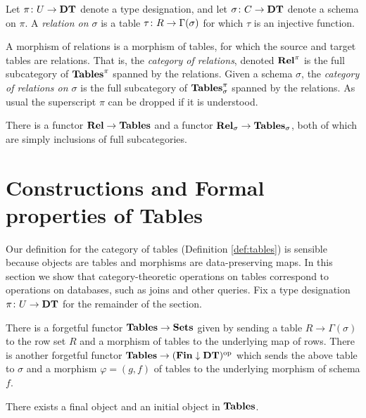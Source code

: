 \documentclass{amsart}
\def\DT{{\bf DT}}
\def\Tables{{\bf Tables}}
\def\Rel{{\bf Rel}}
\def\Fin{{\bf Fin}}
\begin{document}
\begin{definition}\label{def:relational table}

Let $\pi\taking U\to\DT$ denote a type designation, and let $\sigma\taking C\to\DT$ denote a schema on $\pi$.  A {\em relation on $\sigma$} is a table $\tau\colon R\rightarrow\Gamma(\sigma)$ for which $\tau$ is an injective function.  

A morphism of relations is a morphism of tables, for which the source and target tables are relations.  That is, the {\em category of relations}, denoted $\Rel^\pi$ is the full subcategory of $\Tables^\pi$ spanned by the relations.  Given a schema $\sigma$, the {\em category of relations on $\sigma$} is the full subcategory of $\Tables^\pi_\sigma$ spanned by the relations.  As usual the superscript $\pi$ can be dropped if it is understood.

There is a functor $\Rel\to\Tables$ and a functor $\Rel_\sigma\to\Tables_\sigma$, both of which are simply inclusions of full subcategories.

\end{definition}

\section{Constructions and Formal properties of Tables}\label{sec:constructions for tables}

Our definition for the category of tables (Definition \ref{def:tables}) is sensible because objects are tables and morphisms are data-preserving maps.  In this section we show that category-theoretic operations on tables correspond to operations on databases, such as joins and other queries.  Fix a type designation $\pi\taking U\to\DT$ for the remainder of the section.

There is a forgetful functor $\Tables\to\Sets$ given by sending a table $R\to\Gamma(\sigma)$ to the row set $R$ and a morphism of tables to the underlying map of rows.  There is another forgetful functor $\Tables\to(\Fin\down\DT)\op$ which sends the above table to $\sigma$ and a morphism $\varphi=(g,f)$ of tables to the underlying morphism of schema $f$.

\begin{lemma}\label{final object}

There exists a final object and an initial object in $\Tables$.    

\end{lemma}
\end{document}

